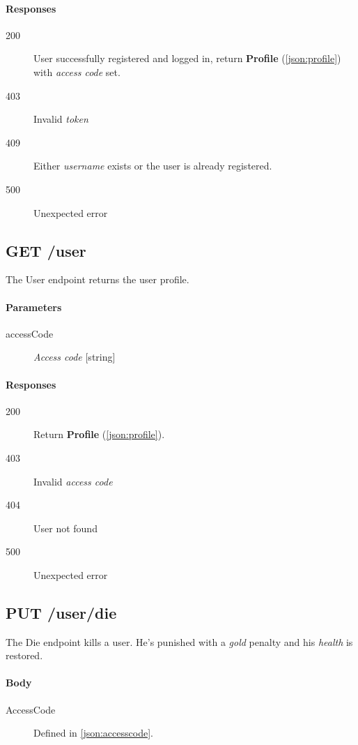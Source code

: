 		\paragraph*{Responses}
			\begin{description}
				\item[200] User successfully registered and logged in, return \textbf{Profile} (\ref{json:profile}) with \textit{access code} set.
				\item[403] Invalid \textit{token}
				\item[409] Either \textit{username} exists or the user is already registered.
				\item[500] Unexpected error
			\end{description}	

	\subsection{GET /user}
	The User endpoint returns the user profile.
		\paragraph*{Parameters}
			\begin{description}
				\item[accessCode] \textit{Access code} [string]
			\end{description}
		\paragraph*{Responses}
			\begin{description}
				\item[200] Return \textbf{Profile} (\ref{json:profile}).
				\item[403] Invalid \textit{access code}
				\item[404] User not found
				\item[500] Unexpected error
			\end{description}

	
	\subsection{PUT /user/die}	
	The Die endpoint kills a user. He's punished with a \textit{gold} penalty and his \textit{health} is restored.
		\paragraph*{Body}
			\begin{description}
				\item[AccessCode] Defined in \ref{json:accesscode}.
			\end{description}
